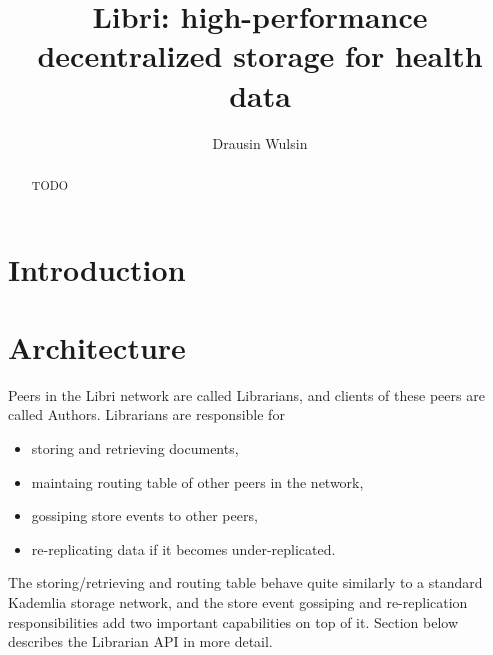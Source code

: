 \documentclass[10pt]{article}
\begin{document}
\title{Libri: high-performance decentralized storage for health data}
\author{Drausin Wulsin}
\maketitle

\begin{abstract}
TODO
\end{abstract}

\section{Introduction}

\section{Architecture}

Peers in the Libri network are called Librarians, and clients of these peers are called Authors. Librarians are responsible for 
\begin{itemize}
	\item storing and retrieving documents,
	\item maintaing routing table of other peers in the network,
	\item gossiping store events to other peers,
	\item re-replicating data if it becomes under-replicated.
\end{itemize}
The storing/retrieving and routing table behave quite similarly to a standard Kademlia storage network, and the store event gossiping and re-replication responsibilities add two important capabilities on top of it. Section \label{sec:API} below describes the Librarian API in more detail.
\end{document}
